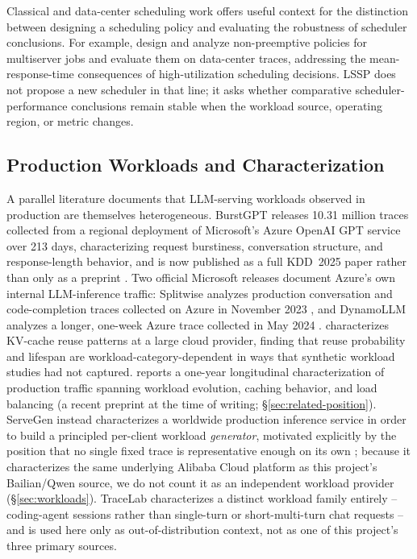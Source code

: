 Classical and data-center scheduling work offers useful context for the
distinction between designing a scheduling policy and evaluating the
robustness of scheduler conclusions. For example,
\citet{chen2026quickswap} design and analyze non-preemptive policies for
multiserver jobs and evaluate them on data-center traces, addressing the
mean-response-time consequences of high-utilization scheduling decisions.
LSSP does not propose a new scheduler in that line; it asks whether
comparative scheduler-performance conclusions remain stable when the
workload source, operating region, or metric changes.

\subsection{Production Workloads and Characterization}
\label{sec:related-workloads}

A parallel literature documents that LLM-serving workloads observed in
production are themselves heterogeneous. BurstGPT releases 10.31 million
traces collected from a regional deployment of Microsoft's Azure OpenAI GPT
service over 213 days, characterizing request burstiness, conversation
structure, and response-length behavior, and is now published as a full
KDD~2025 paper rather than only as a preprint \citep{burstgpt2025}. Two
official Microsoft releases document Azure's own internal LLM-inference
traffic: Splitwise analyzes production conversation and code-completion
traces collected on Azure in November 2023 \citep{patel2024splitwise}, and
DynamoLLM analyzes a longer, one-week Azure trace collected in May 2024
\citep{stojkovic2025dynamollm}. \citet{kvcache_wild2025} characterizes
KV-cache reuse patterns at a large cloud provider, finding that reuse
probability and lifespan are workload-category-dependent in ways that
synthetic workload studies had not captured. \citet{ayearinllmserving2026}
reports a one-year longitudinal characterization of production traffic
spanning workload evolution, caching behavior, and load balancing (a recent
preprint at the time of writing; \S\ref{sec:related-position}).
ServeGen instead characterizes a worldwide production inference service in
order to build a principled per-client workload \emph{generator}, motivated
explicitly by the position that no single fixed trace is representative
enough on its own \citep{servegen2026}; because it characterizes the same
underlying Alibaba Cloud platform as this project's Bailian/Qwen source, we
do not count it as an independent workload provider (\S\ref{sec:workloads}).
TraceLab characterizes a distinct workload family entirely -- coding-agent
sessions rather than single-turn or short-multi-turn chat requests -- and is
used here only as out-of-distribution context, not as one of this
project's three primary sources.

